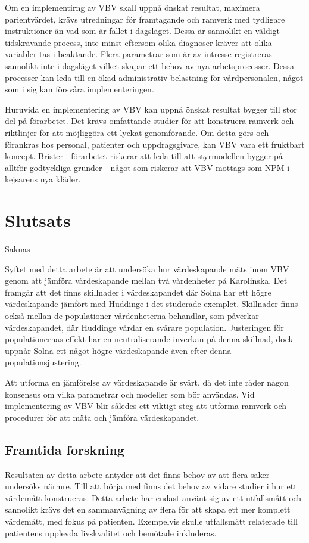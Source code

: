 Om en implementirng av VBV skall uppnå önskat resultat, maximera parientvärdet, krävs utredningar för framtagande och ramverk med tydligare instruktioner än vad som är fallet i dagsläget. Dessa är sannolikt en väldigt tidskrävande process, inte minst eftersom olika diagnoser kräver att olika variabler tas i beaktande. Flera parametrar som är av intresse registreras sannolikt inte i dagsläget vilket skapar ett behov av nya arbetsprocesser. Dessa processer kan leda till en ökad administrativ belastning för vårdpersonalen, något som i sig kan försvåra implementeringen.

Huruvida en implementering av VBV kan uppnå önskat resultat bygger till stor del på förarbetet. Det krävs  omfattande studier för att konstruera ramverk och riktlinjer för att möjliggöra ett lyckat genomförande. Om detta görs och förankras hos personal, patienter och uppdragsgivare, kan VBV vara ett fruktbart koncept. Brister i förarbetet riskerar att leda till att styrmodellen bygger på alltför godtyckliga grunder - något som riskerar att VBV mottags som NPM i kejsarens nya kläder.

\section{Slutsats}

Saknas

Syftet med detta arbete är att undersöka hur värdeskapande mäts inom VBV genom att jämföra värdeskapande mellan två vårdenheter på Karolinska. Det framgår att det finns skillnader i värdeskapandet där Solna har ett högre värdeskapande jämfört med Huddinge i det studerade exemplet. Skillnader finns också mellan de populationer vårdenheterna behandlar, som påverkar värdeskapandet, där Huddinge vårdar en svårare population. Justeringen för populationernas effekt har en neutraliserande inverkan på denna skillnad, dock uppnår Solna ett något högre värdeskapande även efter denna populationsjustering.

Att utforma en jämförelse av värdeskapande är svårt, då det inte råder någon konsensus om vilka parametrar och modeller som bör användas. Vid implementering av VBV blir således ett viktigt steg att utforma ramverk och procedurer för att mäta och jämföra värdeskapandet. 

\subsection{Framtida forskning}

Resultaten av detta arbete antyder att det finns behov av att flera saker undersöks närmre. Till att börja med finns det behov av vidare studier i hur ett värdemått konstrueras. Detta arbete har endast använt sig av ett utfallsmått och sannolikt krävs det en sammanvägning av flera för att skapa ett mer komplett värdemått, med fokus på patienten. Exempelvis skulle utfallsmått relaterade till patientens upplevda livskvalitet och bemötade inkluderas.

